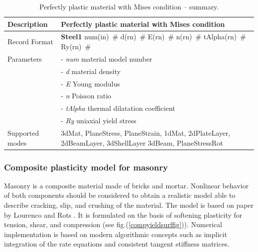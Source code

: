 \documentclass[a4paper]{article}
\newcommand{\descitem}[1]{{\noindent \bf #1}}
\newcommand{\elemparam}[2]{{{#1\tiny (#2)}~\#}}
\newcommand{\param}[1]{{\it #1}}
\begin{document}
\begin{table}[!htb]
\begin{tabular}{|l|p{9cm}|}
\hline
Description & Perfectly plastic material with Mises condition\\
\hline
Record Format & \descitem{Steel1} \elemparam{num}{in}
\elemparam{d}{rn} \elemparam{E}{rn} \elemparam{n}{rn}
\elemparam{tAlpha}{rn} \elemparam{Ry}{rn}\\
Parameters &- \param{num} material model number\\
&- \param{d} material density\\
&- \param{E} Young modulus\\
&- \param{n} Poisson ratio\\
&- \param{tAlpha} thermal dilatation coefficient\\
&- \param{Ry} uniaxial yield stress\\
Supported modes& 3dMat, PlaneStress, PlaneStrain, 1dMat,
2dPlateLayer, 2dBeamLayer, 3dShellLayer
3dBeam, PlaneStressRot\\
\hline
\end{tabular}
\caption{Perfectly plastic material  with Mises condition -- summary.}
\label{Steel1_table}
\end{table}


\subsubsection{Composite plasticity model for masonry}
Masonry is a composite material made of bricks and mortar. Nonlinear behavior of both components should be considered to obtain a realistic model able to describe cracking, slip, and crushing of the material. The model is based on paper by Lourenco and Rots \cite{Rots}. It is formulated on the basis of softening plasticity for tension, shear, and compression (see fig.(\ref{compyieldsurffig})). Numerical implementation is based on modern algorithmic concepts such as implicit integration of the rate equations and consistent tangent stiffness matrices.
\end{document}
